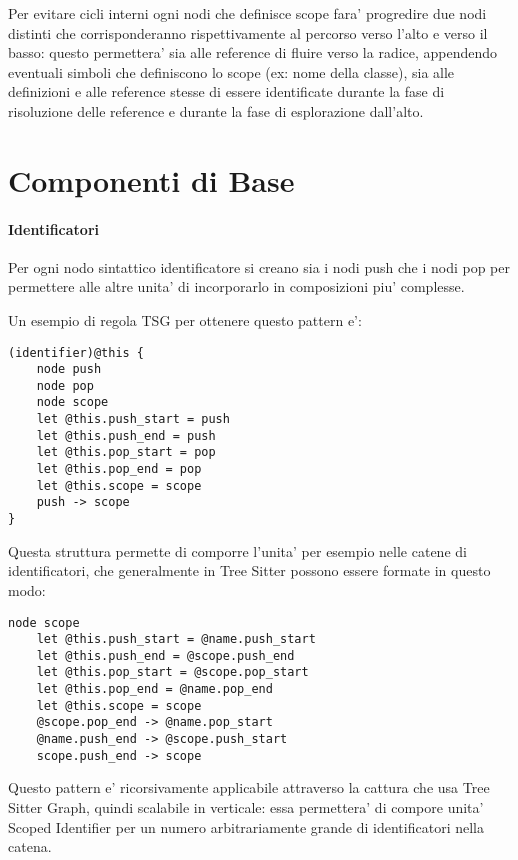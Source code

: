 \par
Per evitare cicli interni ogni nodi che definisce scope fara' progredire due nodi distinti che corrisponderanno rispettivamente al percorso verso l'alto e verso il basso: questo permettera' sia alle reference di fluire verso la radice, appendendo eventuali simboli che definiscono lo scope (ex: nome della classe), sia alle definizioni e alle reference stesse di essere identificate durante la fase di risoluzione delle reference e durante la fase di esplorazione dall'alto.

\section{Componenti di Base}

\paragraph{Identificatori}

Per ogni nodo sintattico identificatore si creano sia i nodi push che i nodi pop per permettere alle altre unita' di incorporarlo in composizioni piu' complesse.


Un esempio di regola TSG per ottenere questo pattern e':

\begin{Verbatim}[samepage=true]
(identifier)@this {
    node push
    node pop
    node scope
    let @this.push_start = push
    let @this.push_end = push
    let @this.pop_start = pop
    let @this.pop_end = pop
    let @this.scope = scope
    push -> scope
}
\end{Verbatim}

Questa struttura permette di comporre l'unita' per esempio nelle catene di identificatori, che generalmente in Tree Sitter possono essere formate in questo modo:

\begin{Verbatim}[samepage=true]
    node scope
    let @this.push_start = @name.push_start
    let @this.push_end = @scope.push_end
    let @this.pop_start = @scope.pop_start
    let @this.pop_end = @name.pop_end
    let @this.scope = scope
    @scope.pop_end -> @name.pop_start
    @name.push_end -> @scope.push_start
    scope.push_end -> scope
\end{Verbatim}

Questo pattern e' ricorsivamente applicabile attraverso la cattura che usa Tree Sitter Graph, quindi scalabile in verticale: essa permettera' di compore unita' Scoped Identifier per un numero arbitrariamente grande di identificatori nella catena.

